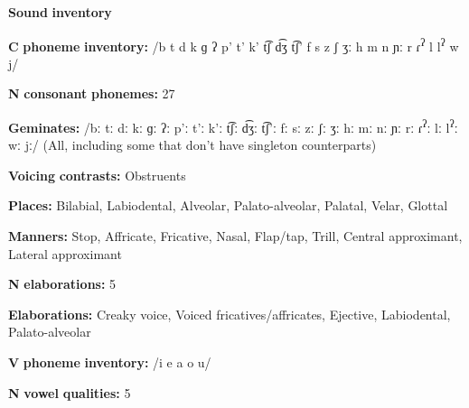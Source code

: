 \documentclass[output=paper]{langsci/langscibook}
\begin{document}
\begin{styleBody}
\textbf{Sound} \textbf{inventory}
\end{styleBody}

\begin{styleBody}
\textbf{C} \textbf{phoneme} \textbf{inventory:} /b t d k ɡ ʔ p’ t’ k’ t͡ʃ d͡ʒ t͡ʃ’ f s z ʃ ʒː h m n ɲː r ɾ\textsuperscript{ʔ} l l\textsuperscript{ʔ} w j/
\end{styleBody}

\begin{styleBody}
\textbf{N} \textbf{consonant} \textbf{phonemes:} 27
\end{styleBody}

\begin{styleBody}
\textbf{Geminates:} /bː tː dː kː ɡː ʔː p’ː t’ː k’ː t͡ʃː d͡ʒː t͡ʃ’ː fː sː zː ʃː ʒː hː mː nː ɲː rː ɾ\textsuperscript{ʔ}ː lː l\textsuperscript{ʔ}ː wː jː/ (All, including some that don’t have singleton counterparts)
\end{styleBody}

\begin{styleBody}
\textbf{Voicing} \textbf{contrasts:} Obstruents
\end{styleBody}

\begin{styleBody}
\textbf{Places:} Bilabial, Labiodental, Alveolar, Palato-alveolar, Palatal, Velar, Glottal
\end{styleBody}

\begin{styleBody}
\textbf{Manners:} Stop, Affricate, Fricative, Nasal, Flap/tap, Trill, Central approximant, Lateral approximant
\end{styleBody}

\begin{styleBody}
\textbf{N} \textbf{elaborations:} 5
\end{styleBody}

\begin{styleBody}
\textbf{Elaborations:} Creaky voice, Voiced fricatives/affricates, Ejective, Labiodental, Palato-alveolar
\end{styleBody}

\begin{styleBody}
\textbf{V} \textbf{phoneme} \textbf{inventory:} /i e a o u/
\end{styleBody}

\begin{styleBody}
\textbf{N} \textbf{vowel} \textbf{qualities:} 5
\end{styleBody}
\end{document}

